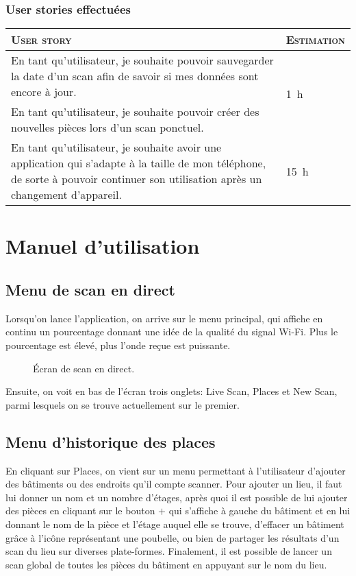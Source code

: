 \documentclass{elsarticle}
\newcommand{\est}[1]{\multirow{2}{*}{\SI{#1}{\hour}}}
\newcommand{\estbis}[1]{\SI{#1}{\hour}}
\begin{document}
\subsubsection{User stories effectuées}
\begin{table}[H]
\centering
\begin{tabular}{p{14cm}m{2cm}}
	\toprule
	\textsc{User story} & \textsc{Estimation}\\
	\midrule
	En tant qu'utilisateur, je souhaite pouvoir sauvegarder la date d'un scan afin de savoir si mes données sont encore à jour. & \est{1}\\
	\midrule
	En tant qu'utilisateur, je souhaite pouvoir créer des nouvelles pièces lors d'un scan ponctuel. & \estbis{7}\\
	\midrule
	En tant qu'utilisateur, je souhaite avoir une application qui s'adapte à la taille de mon téléphone, de sorte à pouvoir continuer son utilisation après un changement d'appareil. & \est{15}\\
	\bottomrule
\end{tabular}
\end{table}

\section{Manuel d'utilisation}
\subsection{Menu de scan en direct}
Lorsqu'on lance l'application, on arrive sur le menu principal, qui affiche en continu un pourcentage donnant une idée de la qualité du signal Wi-Fi.
Plus le pourcentage est élevé, plus l'onde reçue est puissante.

\begin{figure}[!htbp]
	\centering
	\caption{Écran de scan en direct.}
	\label{fig:livescan}
\end{figure}

Ensuite, on voit en bas de l'écran trois onglets: \textsf{Live Scan}, \textsf{Places} et \textsf{New Scan}, parmi lesquels on se trouve actuellement sur le premier.

\subsection{Menu d'historique des places}
En cliquant sur \textsf{Places}, on vient sur un menu permettant à l'utilisateur d'ajouter des bâtiments ou des endroits qu'il compte scanner.
Pour ajouter un lieu, il faut lui donner un nom et un nombre d'étages, après quoi il est possible de lui ajouter des pièces en cliquant sur le bouton \og $+$ \fg{} qui s'affiche à gauche du bâtiment et en lui donnant le nom de la pièce et l'étage auquel elle se trouve, d'effacer un bâtiment grâce à l'icône représentant une poubelle, ou bien de partager les résultats d'un scan du lieu sur diverses plate-formes.
Finalement, il est possible de lancer un scan global de toutes les pièces du bâtiment en appuyant sur le nom du lieu.
\end{document}
